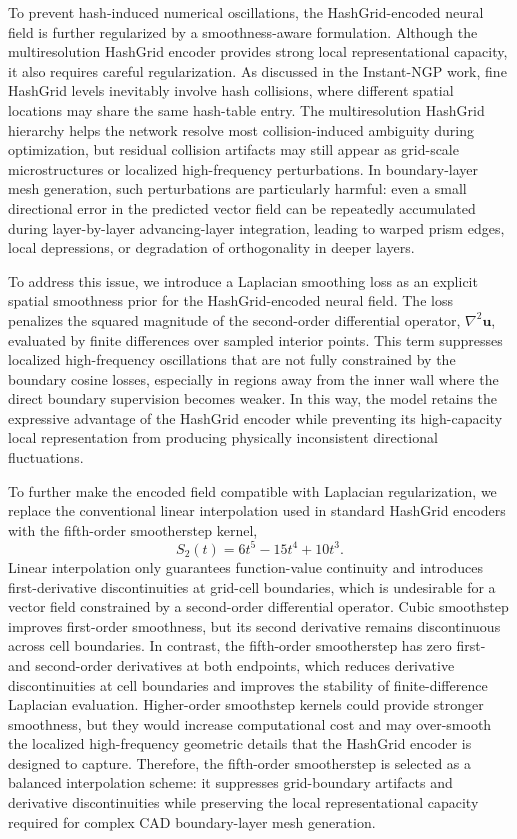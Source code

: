 \documentclass[%
 aip,
 amsmath,amssymb,
 reprint,%
nobibnotes,
]{revtex4-1}
\begin{document}
To prevent hash-induced numerical oscillations, the HashGrid-encoded neural field is further regularized by a smoothness-aware formulation.
Although the multiresolution HashGrid encoder provides strong local representational capacity, it also requires careful regularization. As discussed in the Instant-NGP work, fine HashGrid levels inevitably involve hash collisions, where different spatial locations may share the same hash-table entry. The multiresolution HashGrid hierarchy helps the network resolve most collision-induced ambiguity during optimization, but residual collision artifacts may still appear as grid-scale microstructures or localized high-frequency perturbations. 
In boundary-layer mesh generation, such perturbations are particularly harmful: even a small directional error in the predicted vector field can be repeatedly accumulated during layer-by-layer advancing-layer integration, leading to warped prism edges, local depressions, or degradation of orthogonality in deeper layers.

To address this issue, we introduce a Laplacian smoothing loss as an explicit spatial smoothness prior for the HashGrid-encoded neural field.
The loss penalizes the squared magnitude of the second-order differential operator, $\nabla^2 \mathbf{u}$, evaluated by finite differences over sampled interior points.
This term suppresses localized high-frequency oscillations that are not fully constrained by the boundary cosine losses, especially in regions away from the inner wall where the direct boundary supervision becomes weaker.
In this way, the model retains the expressive advantage of the HashGrid encoder while preventing its high-capacity local representation from producing physically inconsistent directional fluctuations.

To further make the encoded field compatible with Laplacian regularization, we replace the conventional linear interpolation used in standard HashGrid encoders with the fifth-order smootherstep kernel,
    \begin{equation}
        S_2(t)=6t^5-15t^4+10t^3 .
        \label{eq:smootherstep}
    \end{equation}
Linear interpolation only guarantees function-value continuity and introduces first-derivative discontinuities at grid-cell boundaries, which is undesirable for a vector field constrained by a second-order differential operator.
Cubic smoothstep improves first-order smoothness, but its second derivative remains discontinuous across cell boundaries.
In contrast, the fifth-order smootherstep has zero first- and second-order derivatives at both endpoints, which reduces derivative discontinuities at cell boundaries and improves the stability of finite-difference Laplacian evaluation.
Higher-order smoothstep kernels could provide stronger smoothness, but they would increase computational cost and may over-smooth the localized high-frequency geometric details that the HashGrid encoder is designed to capture.
Therefore, the fifth-order smootherstep is selected as a balanced interpolation scheme: it suppresses grid-boundary artifacts and derivative discontinuities while preserving the local representational capacity required for complex CAD boundary-layer mesh generation.
\end{document}

